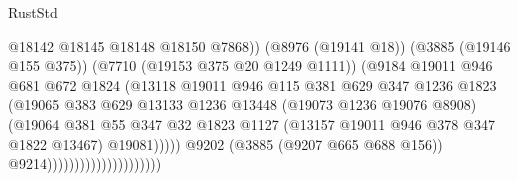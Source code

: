 \begin{lexlean}{RustStd}
\begin{coremodule}
                                                    @18142
                                                    @18145
                                                    @18148
                                                    @18150
                                                    @7868))
                                                (@8976 (@19141 @18))
                                                (@3885 (@19146 @155 @375))
                                                (@7710 (@19153 @375 @20 @1249 @1111))
                                                (@9184
                                                  @19011
                                                  @946
                                                  @681
                                                  @672
                                                  @1824
                                                  (@13118
                                                    @19011
                                                    @946
                                                    @115
                                                    @381
                                                    @629
                                                    @347
                                                    @1236
                                                    @1823
                                                    (@19065
                                                      @383
                                                      @629
                                                      @13133
                                                      @1236
                                                      @13448
                                                      (@19073 @1236 @19076 @8908)
                                                      (@19064
                                                        @381
                                                        @55
                                                        @347
                                                        @32
                                                        @1823
                                                        @1127
                                                        (@13157 @19011 @946 @378 @347 @1822 @13467)
                                                        @19081)))))
                                              @9202
                                              (@3885 (@9207 @665 @688 @156))
                                              @9214)))))))))))))))))))))

\end{coremodule}
\end{lexlean}
